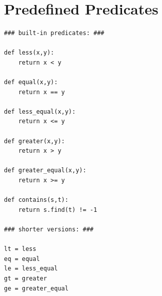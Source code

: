 \documentclass{report}
\begin{document}
\chapter{Predefined Predicates}
\label{app:predicates}

\begin{verbatim}
### built-in predicates: ###

def less(x,y):
    return x < y

def equal(x,y):
    return x == y 

def less_equal(x,y):
    return x <= y

def greater(x,y):
    return x > y

def greater_equal(x,y):
    return x >= y

def contains(s,t):
    return s.find(t) != -1

### shorter versions: ###

lt = less
eq = equal
le = less_equal
gt = greater
ge = greater_equal
\end{verbatim}



\end{document}

